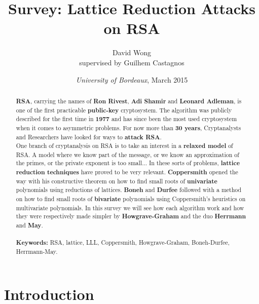 \documentclass[a4paper,11pt]{article}
\title{Survey: Lattice Reduction Attacks on RSA}
\author{David Wong\\
\small{supervised by Guilhem Castagnos}}
\date{\emph{University of Bordeaux}, March 2015}
\begin{document}
\maketitle

\renewcommand{\abstractname}{Abstract}
\begin{abstract}
\textbf{RSA}, carrying the names of \textbf{Ron Rivest}, \textbf{Adi Shamir} and \textbf{Leonard Adleman}, is one of the first practicable \textbf{public-key} cryptosystem. The algorithm was publicly described for the first time in \textbf{1977} and has since been the most used cryptosystem when it comes to asymmetric problems. For now more than \textbf{30 years}, Cryptanalysts and Researchers have looked for ways to \textbf{attack RSA}.\\
One branch of cryptanalysis on RSA is to take an interest in a \textbf{relaxed model} of RSA. A model where we know part of the message, or we know an approximation of the primes, or the private exponent is too small... In these sorts of problems, \textbf{lattice reduction techniques} have proved to be very relevant. \textbf{Coppersmith} opened the way with his constructive theorem on how to find small roots of \textbf{univariate} polynomials using reductions of lattices. \textbf{Boneh} and \textbf{Durfee} followed with a method on how to find small roots of \textbf{bivariate} polynomials using Coppersmith's heuristics on multivariate polynomials. In this survey we will see how each algorithm work and how they were respectively made simpler by \textbf{Howgrave-Graham} and the duo \textbf{Herrmann} and \textbf{May}.\\
\\
\textbf{Keywords:} RSA, lattice, LLL, Coppersmith, Howgrave-Graham, Boneh-Durfee, Herrmann-May.\\

\end{abstract}

\section{Introduction}\label{introduction}
\end{document}
